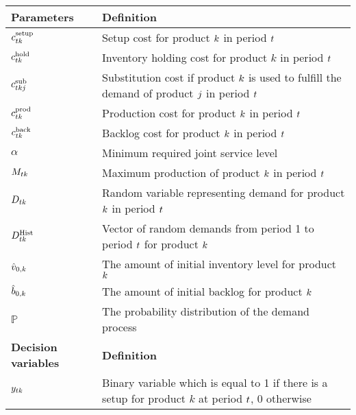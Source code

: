 \documentclass[msom]{oo}
\begin{document}
\begin{table}[ht]
\begin{adjustbox}{width=1\textwidth,center=\textwidth}
\begin{tabular}{ll}
\midrule 
{\textbf {Parameters}} & {\textbf {Definition}} \\ \midrule
$c^{\text{setup}}_{t k}$ & Setup cost for product $k$ in period $t$ \\ 
$c^{\text{hold}}_{t k}$  & Inventory holding cost for product $k$ in period $t$  \\ 
$c^{\text{sub}}_{t k j }$  & Substitution cost if product $k$  is used to fulfill the demand of product $j$  in period $t$  \\ 
$c^{\text{prod}}_{t k}$  & Production cost for product $k$ in period $t$  \\
$c^{\text{back}}_{t k}$  & Backlog cost for product $k$  in period $t$ \\
$\alpha$  & Minimum required joint service level \\ 
$M_{t k}$  & Maximum production of product $k$ in period $t$ \\ 
${D}_{t k}$ & Random variable representing demand for product $k $ in period $t$  \\ 
${D}^\text{Hist}_{t k}$ & Vector of random demands from period 1 to period $t$ for product $k $  \\ 
$\hat{v}_{0,k} $&  The amount of initial inventory level for product $k$ \\
$\hat{b}_{0,k} $&  The amount of initial backlog for product $k$   \\
$\mathbb{P} $&  The probability distribution of the demand process \\ %
\midrule
{\textbf {Decision variables}} & {\textbf {Definition}} \\ \midrule
$y_{t k}$ & Binary variable which is equal to 1 if there is a setup for product $k$ at period $t$, 0 otherwise \\ 

\end{tabular}
\end{adjustbox}
\end{table}
\end{document}
